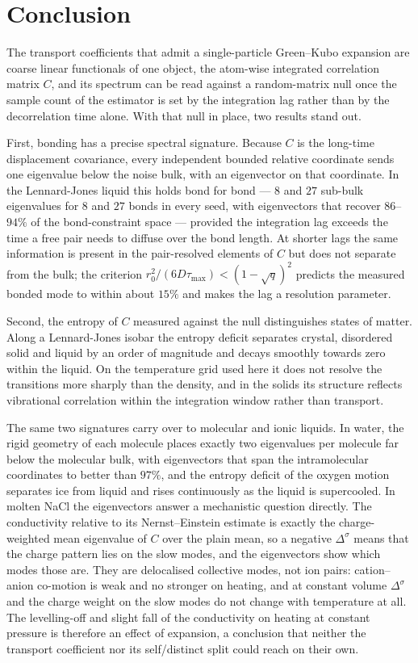 \section{Conclusion}
\label{sec:conclusion}
The transport coefficients that admit a single-particle Green--Kubo expansion are coarse linear functionals of one object, the atom-wise integrated correlation matrix $C$, and its spectrum can be read against a random-matrix null once the sample count of the estimator is set by the integration lag rather than by the decorrelation time alone.
With that null in place, two results stand out.

First, bonding has a precise spectral signature.
Because $C$ is the long-time displacement covariance, every independent bounded relative coordinate sends one eigenvalue below the noise bulk, with an eigenvector on that coordinate.
In the Lennard-Jones liquid this holds bond for bond --- $8$ and $27$ sub-bulk eigenvalues for $8$ and $27$ bonds in every seed, with eigenvectors that recover $86$--$94\%$ of the bond-constraint space --- provided the integration lag exceeds the time a free pair needs to diffuse over the bond length.
At shorter lags the same information is present in the pair-resolved elements of $C$ but does not separate from the bulk; the criterion $r_{0}^{2}/(6D\tau_{\max}) < (1-\sqrt{q})^{2}$ predicts the measured bonded mode to within about $15\%$ and makes the lag a resolution parameter.

Second, the entropy of $C$ measured against the null distinguishes states of matter.
Along a Lennard-Jones isobar the entropy deficit separates crystal, disordered solid and liquid by an order of magnitude and decays smoothly towards zero within the liquid.
On the temperature grid used here it does not resolve the transitions more sharply than the density, and in the solids its structure reflects vibrational correlation within the integration window rather than transport.

The same two signatures carry over to molecular and ionic liquids.
In water, the rigid geometry of each molecule places exactly two eigenvalues per molecule far below the molecular bulk, with eigenvectors that span the intramolecular coordinates to better than $97\%$, and the entropy deficit of the oxygen motion separates ice from liquid and rises continuously as the liquid is supercooled.
In molten NaCl the eigenvectors answer a mechanistic question directly.
The conductivity relative to its Nernst--Einstein estimate is exactly the charge-weighted mean eigenvalue of $C$ over the plain mean, so a negative $\Delta^{\sigma}$ means that the charge pattern lies on the slow modes, and the eigenvectors show which modes those are.
They are delocalised collective modes, not ion pairs: cation--anion co-motion is weak and no stronger on heating, and at constant volume $\Delta^{\sigma}$ and the charge weight on the slow modes do not change with temperature at all.
The levelling-off and slight fall of the conductivity on heating at constant pressure is therefore an effect of expansion, a conclusion that neither the transport coefficient nor its self/distinct split could reach on their own.

